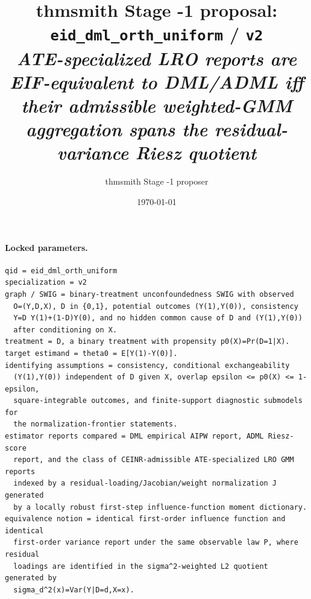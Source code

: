 \documentclass[11pt]{article}
\title{thmsmith Stage -1 proposal: \texttt{eid\_dml\_orth\_uniform} / \texttt{v2}%
  \\ \large\textit{ATE-specialized LRO reports are EIF-equivalent to DML/ADML iff their admissible weighted-GMM aggregation spans the residual-variance Riesz quotient}}
\author{thmsmith Stage -1 proposer}
\date{\today}
\theoremstyle{definition}
\theoremstyle{plain}
\theoremstyle{remark}
\begin{document}
\maketitle


\paragraph{Locked parameters.}
\begin{verbatim}
qid = eid_dml_orth_uniform
specialization = v2
graph / SWIG = binary-treatment unconfoundedness SWIG with observed
  O=(Y,D,X), D in {0,1}, potential outcomes (Y(1),Y(0)), consistency
  Y=D Y(1)+(1-D)Y(0), and no hidden common cause of D and (Y(1),Y(0))
  after conditioning on X.
treatment = D, a binary treatment with propensity p0(X)=Pr(D=1|X).
target estimand = theta0 = E[Y(1)-Y(0)].
identifying assumptions = consistency, conditional exchangeability
  (Y(1),Y(0)) independent of D given X, overlap epsilon <= p0(X) <= 1-epsilon,
  square-integrable outcomes, and finite-support diagnostic submodels for
  the normalization-frontier statements.
estimator reports compared = DML empirical AIPW report, ADML Riesz-score
  report, and the class of CEINR-admissible ATE-specialized LRO GMM reports
  indexed by a residual-loading/Jacobian/weight normalization J generated
  by a locally robust first-step influence-function moment dictionary.
equivalence notion = identical first-order influence function and identical
  first-order variance report under the same observable law P, where residual
  loadings are identified in the sigma^2-weighted L2 quotient generated by
  sigma_d^2(x)=Var(Y|D=d,X=x).
\end{verbatim}
\end{document}
